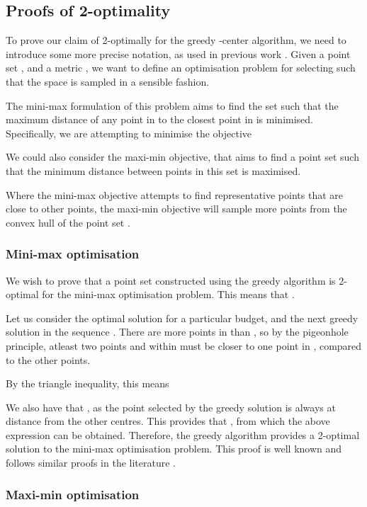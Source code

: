\documentclass{article}
\begin{document}
\subsection{Proofs of 2-optimality}
\label{sec:proofs_of_2_optimality}
To prove our claim of 2-optimally for the greedy -center algorithm, we need to introduce some more precise notation, as used in previous work \citep{pronzato2017minimax}. Given a point set , and a metric , we want to define an optimisation problem for selecting  such that the space  is sampled in a sensible fashion. 

The mini-max formulation of this problem aims to find the set  such that the maximum distance of any point in  to the closest point in  is minimised. Specifically, we are attempting to minimise the objective 



We could also consider the maxi-min objective, that aims to find a point set  such that the minimum distance between points in this set is maximised.



Where the mini-max objective attempts to find representative points that are close to other points, the maxi-min objective will sample more points from the convex hull of the point set .

\subsubsection{Mini-max optimisation}

We wish to prove that a point set constructed using the greedy algorithm  is 2-optimal for the mini-max optimisation problem. This means that .

Let us consider the optimal solution  for a particular budget, and the next greedy solution in the sequence . There are more points in  than , so by the pigeonhole principle, atleast two points  and  within  must be closer to one point  in , compared to the other points. 

By the triangle inequality, this means


We also have that , as the  point selected by the greedy solution is always at distance  from the other centres. This provides that , from which the above expression can be obtained. Therefore, the greedy algorithm provides a 2-optimal solution to the mini-max optimisation problem. This proof is well known and follows similar proofs in the literature \citep{garcia2019approximation}.

\subsubsection{Maxi-min optimisation}
\end{document}

